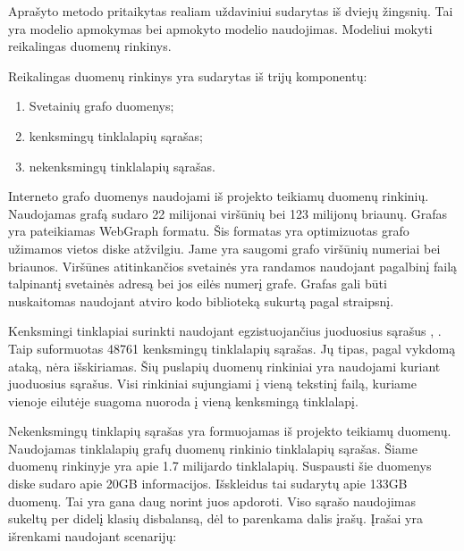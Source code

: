 Aprašyto metodo pritaikytas realiam uždaviniui sudarytas iš dviejų žingsnių. Tai yra modelio apmokymas
bei apmokyto modelio naudojimas. Modeliui mokyti reikalingas duomenų rinkinys.


Reikalingas duomenų rinkinys yra sudarytas iš trijų komponentų:
\begin{enumerate}
    \item Svetainių grafo duomenys;
    \item kenksmingų tinklalapių sąrašas;
    \item nekenksmingų tinklalapių sąrašas.
\end{enumerate}

Interneto grafo duomenys naudojami iš \cite{webgraph} projekto teikiamų duomenų rinkinių. Naudojamas grafą sudaro 22
milijonai viršūnių bei 123 milijonų briaunų. Grafas yra pateikiamas WebGraph formatu. Šis formatas yra optimizuotas
grafo užimamos vietos diske atžvilgiu. Jame yra saugomi grafo viršūnių numeriai bei briaunos. Viršūnes atitinkančios
svetainės yra randamos naudojant pagalbinį failą talpinantį svetainės adresą bei jos eilės numerį grafe. Grafas
gali būti nuskaitomas naudojant atviro kodo biblioteką sukurtą pagal \cite{boldi2004webgraph} straipsnį.

Kenksmingi tinklapiai surinkti naudojant egzistuojančius juoduosius sąrašus \cite{mal1}, \cite{mal2} \cite{mal3}
\cite{mal4}. Taip suformuotas 48761 kenksmingų tinklalapių sąrašas. Jų tipas, pagal vykdomą ataką, nėra išskiriamas.
Šių puslapių duomenų rinkiniai yra naudojami kuriant juoduosius sąrašus. Visi rinkiniai sujungiami į vieną tekstinį
failą, kuriame vienoje eilutėje suagoma nuoroda į vieną kenksmingą tinklalapį.


Nekenksmingų tinklapių sąrašas yra formuojamas iš \cite{webgraph} projekto teikiamų duomenų. Naudojamas tinklalapių
grafų duomenų rinkinio tinklalapių sąrašas. Šiame duomenų rinkinyje yra apie 1.7 milijardo tinklalapių. Suspausti
šie duomenys diske sudaro apie 20GB informacijos. Išskleidus tai sudarytų apie 133GB duomenų. Tai yra gana daug
norint juos apdoroti. Viso sąrašo naudojimas sukeltų per didelį klasių disbalansą, dėl to parenkama dalis įrašų.
Įrašai yra išrenkami naudojant scenarijų:

